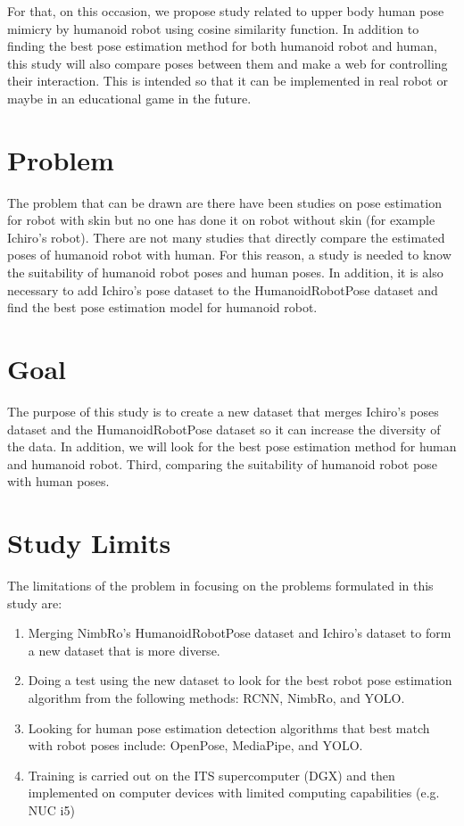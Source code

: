 For that, on this occasion, we propose study related to upper body human pose mimicry by humanoid robot using cosine similarity function. 
In addition to finding the best pose estimation method for both humanoid robot and human, this study will also compare poses between them and make a web for controlling their interaction.
This is intended so that it can be implemented in real robot or maybe in an educational game in the future.

\section{Problem}
\label{sec:problem}

The problem that can be drawn are there have been studies on pose estimation for robot with skin but no one has done it on robot without skin (for example Ichiro's robot).
There are not many studies that directly compare the estimated poses of humanoid robot with human. 
For this reason, a study is needed to know the suitability of humanoid robot poses and human poses. 
In addition, it is also necessary to add Ichiro's pose dataset to the HumanoidRobotPose dataset and find the best pose estimation model for humanoid robot.

\section{Goal}
\label{sec:goal}

The purpose of this study is to create a new dataset that merges Ichiro's poses dataset and the HumanoidRobotPose dataset so it can increase the diversity of the data. In addition,
we will look for the best pose estimation method for human and humanoid robot. Third, comparing the suitability of humanoid robot pose with human poses.

\section{Study Limits}
\label{sec:studylimits}

The limitations of the problem in focusing on the problems formulated in this study are:

\begin{enumerate}[nolistsep]

  \item Merging NimbRo's HumanoidRobotPose dataset and Ichiro's dataset to form a new dataset that is more diverse.
  \item Doing a test using the new dataset to look for the best robot pose estimation algorithm from the following methods: RCNN, NimbRo, and YOLO.
  \item Looking for human pose estimation detection algorithms that best match with robot poses include: OpenPose, MediaPipe, and YOLO.
  \item Training is carried out on the ITS supercomputer (DGX) and then implemented on computer devices with limited computing capabilities (e.g. NUC i5)

\end{enumerate}

